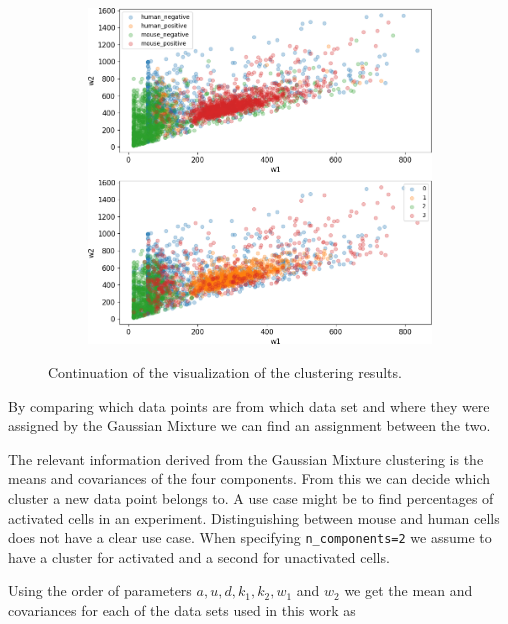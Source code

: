 \begin{figure}
\begin{subfigure}{0.49\textwidth}
	\end{subfigure}
	\hfill
	\begin{subfigure}{0.49\textwidth}
		\includegraphics[width=\textwidth]{fig/seperate_w1_w2}
	\end{subfigure}
	
	\caption{Continuation of the visualization of the clustering results.}
	\label{fig:vis_output_seperate4}
\end{figure}

By comparing which data points are from which data set and where they were assigned by the Gaussian Mixture we can find an assignment between the two.

\newpage

The relevant information derived from the Gaussian Mixture clustering is the means and covariances of the four components. From this we can decide which cluster a new data point belongs to. A use case might be to find percentages of activated cells in an experiment. Distinguishing between mouse and human cells does not have a clear use case. When specifying \texttt{n\_components=2} we assume to have a cluster for activated and a second for unactivated cells.

Using the order of parameters $a, u, d, k_1, k_2, w_1$ and $w_2$ we get the mean and covariances for each of the data sets used in this work as 

